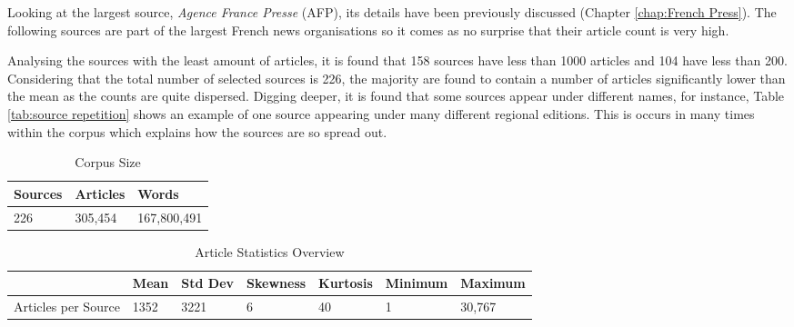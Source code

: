 Looking at the largest source, \emph{Agence France Presse} (AFP), its details have been previously discussed (Chapter \ref{chap:French Press}). The following sources are part of the largest French news organisations so it comes as no surprise that their article count is very high.

Analysing the sources with the least amount of articles, it is found that 158 sources have less than 1000 articles and 104 have less than 200. Considering that the total number of selected sources is 226, the majority are found to contain a number of articles significantly lower than the mean as the counts are quite dispersed. Digging deeper, it is found that some sources appear under different names, for instance, Table \ref{tab:source repetition} shows an example of one source appearing under many different regional editions. This is occurs in many times within the corpus which explains how the sources are so spread out. 

\begin{table}[]
\centering
\begin{tabular}{lll}
\toprule
Sources & Articles & Words \\ \hline
226 & 305,454 & 167,800,491 \\
\bottomrule
\end{tabular}
\caption{Corpus Size}
\label{tab: corpus size}
\end{table}

\begin{table}[]
\centering
\begin{tabular}{@{}lllllll@{}}
\toprule
 & Mean & Std Dev & Skewness & Kurtosis & Minimum & Maximum \\ \midrule
Articles per Source & 1352 & 3221 & 6 & 40 & 1 & 30,767 \\ \bottomrule
\end{tabular}
\caption{Article Statistics Overview}
\label{tab:core stat source}
\end{table}

